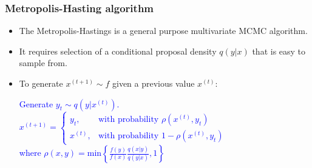 \documentclass{beamer}
\begin{document}
\begin{frame}
  \frametitle{Metropolis-Hasting algorithm}
  
  \begin{itemize}
  \item The Metropolis-Hastings is a general purpose multivariate MCMC
    algorithm.
\item It requires selection of a conditional proposal density
  $q\left(y|x\right)$ that is easy to sample from.
\item To generate $x^{(t+1)} \sim f$ given a previous value $x^{(t)}$:
\vspace{-12pt}
\textcolor{blue}{
  \begin{algorithmic}[1]
  \STATE Generate $y_t \sim q\left(y|x^{(t)}\right)$.
\STATE $x^{(t+1)} = \left\{\begin{array}{ll}
    y_t, & \text{with probability } \rho\left(x^{(t)}, y_t\right) \\
    x^{(t)}, & \text{with probability } 1 - \rho\left(x^{(t)}, y_t\right) 
	\end{array} \right.$ \\
where $\displaystyle \rho\left(x, y\right) =
\text{min}\left\{\frac{f(y)}{f(x)}\frac{q(x|y)}{q(y|x)}, 1\right\} $
  \end{algorithmic}
}
  \end{itemize}

\end{frame}
\end{document}
